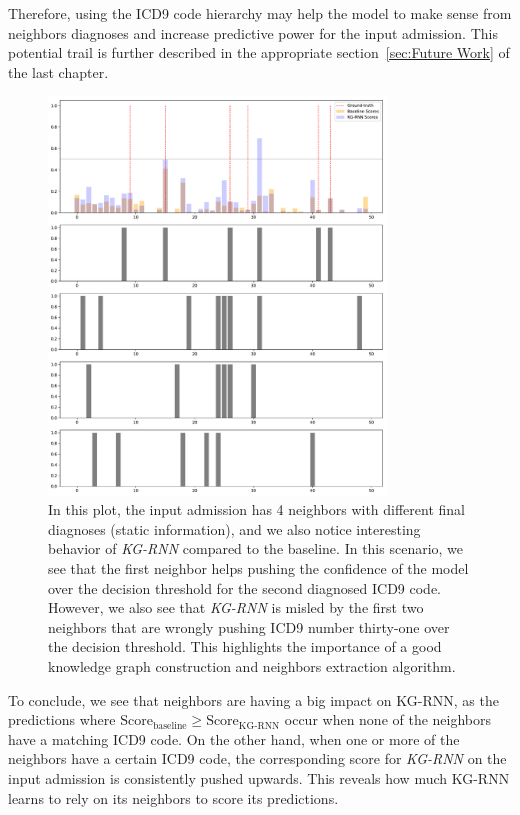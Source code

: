Therefore, using the ICD9 code hierarchy may help the model to make sense from neighbors diagnoses and increase predictive power for the input admission. This potential trail is further described in the appropriate section~\ref{sec:Future Work} of the last chapter.

\newpage
\begin{figure}[H]
 \centering
 \includegraphics[width=0.8\textwidth]{figures/preds-1.pdf}
 \caption{In this plot, the input admission has 4 neighbors with different final diagnoses (static information), and we also notice interesting behavior of \emph{KG-RNN} compared to the baseline. In this scenario, we see that the first neighbor helps pushing the confidence of the model over the decision threshold for the second diagnosed ICD9 code. However, we also see that \emph{KG-RNN} is misled by the first two neighbors that are wrongly pushing ICD9 number thirty-one over the decision threshold. This highlights the importance of a good knowledge graph construction and neighbors extraction algorithm.}
\end{figure}

To conclude, we see that neighbors are having a big impact on KG-RNN, as the predictions where $\mbox{Score}_{\mbox{baseline}} \ge \mbox{Score}_{\mbox{KG-RNN}}$ occur when none of the neighbors have a matching ICD9 code. On the other hand, when one or more of the neighbors have a certain ICD9 code, the corresponding score for \emph{KG-RNN} on the input admission is consistently pushed upwards. This reveals how much KG-RNN learns to rely on its neighbors to score its predictions.